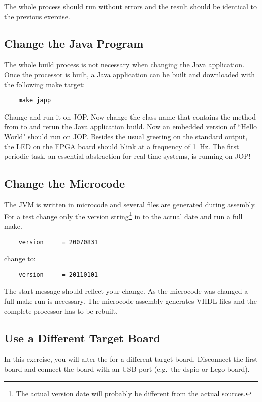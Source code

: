 The whole process should run without errors and the result should be
identical to the previous exercise.

\subsection{Change the Java Program}

The whole build process is not necessary when changing the Java
application. Once the processor is built, a Java application can be
built and downloaded with the following make target:
\begin{verbatim}
    make japp
\end{verbatim}
Change  and run it on JOP. Now change the class
name that contains the  method from  to
 and rerun the Java application build. Now an embedded
version of ``Hello World" should run on JOP. Besides the usual
greeting on the standard output, the LED on the FPGA board should
blink at a frequency of 1~Hz. The first periodic task, an essential
abstraction for real-time systems, is running on JOP!

\subsection{Change the Microcode}

The JVM is written in microcode and several  files are
generated during assembly. For a test change only the version
string\footnote{The actual version date will probably be different
from the actual sources.} in  to the actual date and
run a full make.
\begin{verbatim}
    version     = 20070831
\end{verbatim}
    change to:
\begin{verbatim}
    version     = 20110101
\end{verbatim}
The start message should reflect your change. As the microcode was
changed a full make run is necessary. The microcode assembly
generates VHDL files and the complete processor has to be rebuilt.


\subsection{Use a Different Target Board}

In this exercise, you will alter the  for a different
target board. Disconnect the first board and connect the board with
an USB port (e.g.\ the dspio or Lego board).

